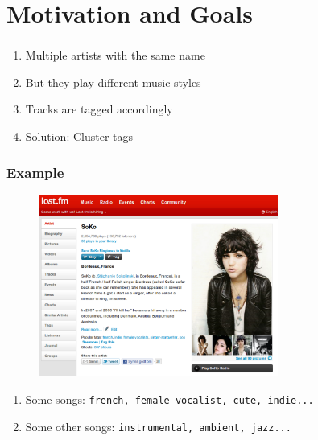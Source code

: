 \documentclass[slidestop,compress,mathserif,serif,notes=show]{beamer}
\title{\docTitle}
\begin{document}
  


  \section{Motivation and Goals}
  \begin{frame}
    \frametitle{\secname}
    \vspace*{0.5cm}
    \begin{enumerate}
      \item{}
      Multiple artists with the same name
      \item{}
      But they play different music styles
      \item{}
      Tracks are tagged accordingly
      \item{}
      Solution: Cluster tags
    \end{enumerate}
    
  \end{frame}

  \begin{frame}
    \frametitle{Example}
    \vspace*{0.5cm}
    \begin{figure}
      \centering 
      \includegraphics[width=0.7\textwidth]{figs/soko.pdf} 
      \label{fig:soko} 
    \end{figure}
    \begin{enumerate}
      \item{}
      Some songs: \texttt{french, female vocalist, cute, indie...}
      \item{}
      Some other songs: \texttt{instrumental, ambient, jazz...}
    \end{enumerate}
  \end{frame}
\end{document}

